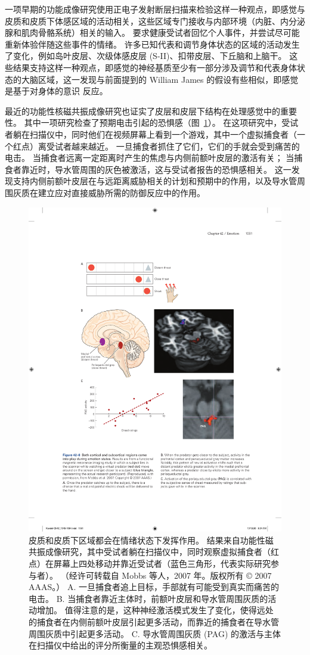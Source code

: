一项早期的功能成像研究使用正电子发射断层扫描来检验这样一种观点，即感觉与皮质和皮质下体感区域的活动相关，这些区域专门接收与内部环境（内脏、内分泌腺和肌肉骨骼系统）相关的输入。
要求健康受试者回忆个人事件，并尝试尽可能重新体验伴随这些事件的情绪。
许多已知代表和调节身体状态的区域的活动发生了变化，例如岛叶皮层、次级体感皮层 (S-II)、扣带皮层、下丘脑和上脑干。
这些结果支持这样一种观点，即感觉的神经基质至少有一部分涉及调节和代表身体状态的大脑区域，这一发现与前面提到的 William James 的假设有些相似，即感觉是基于对身体的意识 反应。


最近的功能性核磁共振成像研究也证实了皮层和皮层下结构在处理感觉中的重要性。
其中一项研究检查了预期电击引起的恐惧感（图~\ref{fig:42_8}）。
在这项研究中，受试者躺在扫描仪中，同时他们在视频屏幕上看到一个游戏，其中一个虚拟捕食者（一个红点）离受试者越来越近。
一旦捕食者抓住了它们，它们的手就会受到痛苦的电击。
当捕食者远离一定距离时产生的焦虑与内侧前额叶皮层的激活有关；
当捕食者靠近时，导水管周围的灰色被激活，这与受试者报告的恐惧感相关。
这一发现支持内侧前额叶皮层在与远距离威胁相关的计划和预期中的作用，以及导水管周围灰质在建立应对直接威胁所需的防御反应中的作用。


\begin{figure}[htbp]
	\centering
	\includegraphics[width=0.75\linewidth]{chap42/fig_42_8}
	\caption{皮质和皮质下区域都会在情绪状态下发挥作用。 结果来自功能性磁共振成像研究，其中受试者躺在扫描仪中，同时观察虚拟捕食者（红点）在屏幕上四处移动并靠近受试者（蓝色三角形，代表实际研究参与者）。 （经许可转载自 Mobbs 等人，2007 年。版权所有 © 2007 AAAS。） A. 一旦捕食者追上目标，手部就有可能受到真实而痛苦的电击。 B. 当捕食者靠近主体时，前额叶皮层和导水管周围灰质的活动增加。 值得注意的是，这种神经激活模式发生了变化，使得远处的捕食者在内侧前额叶皮层引起更多活动，而靠近的捕食者在导水管周围灰质中引起更多活动。 C. 导水管周围灰质 (PAG) 的激活与主体在扫描仪中给出的评分所衡量的主观恐惧感相关。}
	\label{fig:42_8}
\end{figure}


